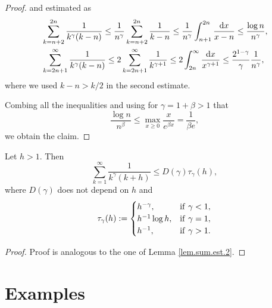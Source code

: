\begin{proof}
and estimated as
\begin{equation*}
\begin{aligned}
&\sum_{k=n+2}^{2n} \frac{1}{k^{\gamma}(k-n) } 
\leq 
\frac{1}{n^{\gamma}} \sum_{k=n+2}^{2n} \frac{1}{k-n } 
\leq 
\frac{1}{n^{\gamma}} \int_{n+1}^{2n}  \frac{{{{\rm d}}} x}{x-n} 
\leq  \frac{\log n}{n^{\gamma}}, 
\\
&\sum_{k=2n+1}^{\infty} \frac{1}{k^{\gamma}(k-n)} 
 \leq
2\sum_{k=2n+1}^{\infty} \frac{1}{k^{\gamma+1}} 
\leq  
2 \int_{2n}^{\infty}  \frac{{{{\rm d}}} x}{x^{\gamma +1}}
\leq 
\frac{2^{1-\gamma}}{\gamma}\frac{1}{n^{\gamma}}
,
\end{aligned}
\end{equation*}
where we used $k-n >k/2$ in the second estimate.

Combing all the inequalities and using for $\gamma = 1+\beta >1$ that 
\begin{equation}\label{log.est}
\frac{\log n}{n^{\beta}} \leq \max_{x \geq 0} \frac{x} {e^{\beta x}} = \frac{1}{\beta e}, 
\end{equation}
we obtain the claim.
\end{proof}

\begin{lemma}\label{lem.h}
Let $h>1$. Then
\begin{equation*}
\sum_{k=1}^{\infty} \frac{1}{ k^{\gamma}(k+h) }
\leq 
D(\gamma) \tau_{\gamma}(h),
\end{equation*}
where $D(\gamma)$ does not depend on $h$ and
\begin{equation*}
\tau_{\gamma}(h):=
\begin{cases}
h^{-\gamma}, & {\rm if} \ \gamma < 1, \\
h^{-1} \log h , & {\rm if} \ \gamma = 1, \\
h^{-1}, & {\rm if} \ \gamma > 1.
\end{cases}
\end{equation*}
\end{lemma}
\begin{proof}
Proof is analogous to the one of Lemma \ref{lem.sum.est.2}.
\end{proof}

\section{Examples}
\label{sec.ex}

